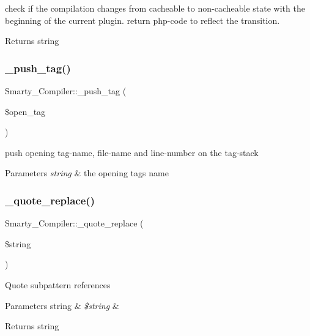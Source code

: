 check if the compilation changes from cacheable to non-\/cacheable state with the beginning of the current plugin. return php-\/code to reflect the transition. \begin{DoxyReturn}{Returns}
string 
\end{DoxyReturn}
\mbox{\label{class_smarty___compiler_a553d4bd92f21bc3714bf1cadeb61a9d7}} 
\subsubsection{\texorpdfstring{\+\_\+push\+\_\+tag()}{\_push\_tag()}}
{\footnotesize\ttfamily Smarty\+\_\+\+Compiler\+::\+\_\+push\+\_\+tag (\begin{DoxyParamCaption}\item[{}]{\$open\+\_\+tag }\end{DoxyParamCaption})}

push opening tag-\/name, file-\/name and line-\/number on the tag-\/stack 
\begin{DoxyParams}{Parameters}
{\em string} & the opening tag\textquotesingle{}s name \\
\hline
\end{DoxyParams}
\mbox{\label{class_smarty___compiler_abc08d6f05e29019bfff39a7e9d315feb}} 
\subsubsection{\texorpdfstring{\+\_\+quote\+\_\+replace()}{\_quote\_replace()}}
{\footnotesize\ttfamily Smarty\+\_\+\+Compiler\+::\+\_\+quote\+\_\+replace (\begin{DoxyParamCaption}\item[{}]{\$string }\end{DoxyParamCaption})}

Quote subpattern references


\begin{DoxyParams}[1]{Parameters}
string & {\em \$string} & \\
\hline
\end{DoxyParams}
\begin{DoxyReturn}{Returns}
string 
\end{DoxyReturn}
\mbox{\label{class_smarty___compiler_a059eb89b6a2caca24b4dca502cb79ed9}} 
